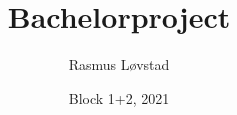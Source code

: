 \documentclass[12pt,a4paper,oneside,draft]{article}
\begin{document}
\title{Bachelorproject}
\author{Rasmus Løvstad}
\date{Block 1+2, 2021}
\maketitle

\tableofcontents








\printbibliography
\end{document}
